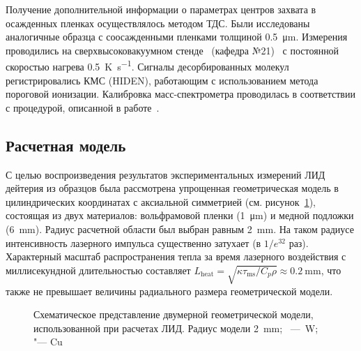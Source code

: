 Получение дополнительной информации о параметрах центров захвата в осажденных пленках осуществлялось методом ТДС. Были исследованы аналогичные образца с соосажденными пленками толщиной \SI{0.5}{\micro\metre}. Измерения проводились на сверхвысоковакуумном стенде \thesisOrganizationShort \ (кафедра №21)~\cite{Rusinov2009} с постоянной скоростью нагрева \SI{0.5}{\kelvin\per\second}. Сигналы десорбированных молекул регистрировались КМС (HIDEN), работающим с использованием метода пороговой ионизации. Калибровка масс-спектрометра проводилась в соответствии с процедурой, описанной в работе~\cite{Rusinov2009}.

\subsection{Расчетная модель}\label{subsec:ch4/sec1/subsec3}

С целью воспроизведения результатов экспериментальных измерений ЛИД дейтерия из образцов была рассмотрена упрощенная геометрическая модель в цилиндрических координатах с аксиальной симметрией (см. рисунок~\cref{fig:ch4/LID_geom}), состоящая из двух материалов: вольфрамовой пленки (\SI{1}{\micro\meter}) и медной подложки (\SI{6}{\milli\meter}). Радиус расчетной области был выбран равным \SI{2}{\milli\meter}. На таком радиусе интенсивность лазерного импульса существенно затухает (в \( 1/e^{32} \) раз). Характерный масштаб распространения тепла за время лазерного воздействия с миллисекундной длительностью составляет \( L_\mathrm{heat}=\sqrt{\kappa \tau_\mathrm{ms}/C_p \rho} \approx \SI{0.2}{\milli\meter} \), что также не превышает величины радиального размера геометрической модели.

\begin{figure}[ht]
    \caption{Схематическое представление двумерной геометрической модели, использованной при расчетах ЛИД. Радиус модели \SI{2}{\milli\meter}; \cruleme[customgrey]{0.5cm}{0.5cm}~---~W; \cruleme[customorange]{0.5cm}{0.5cm} "--- Cu}\label{fig:ch4/LID_geom}
\end{figure}

